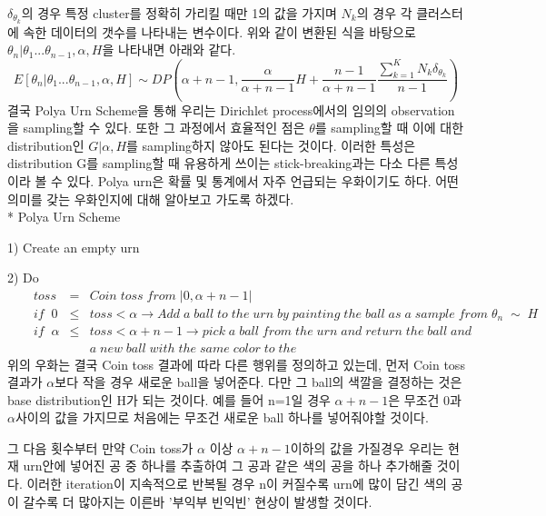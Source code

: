 \documentclass[a4paper]{oblivoir}
\begin{document}
$\delta_{\theta_{k}}$의 경우 특정 cluster를 정확히 가리킬 때만 1의 값을 가지며 $N_{k}$의 경우 각 클러스터에 속한 데이터의 갯수를 나타내는 변수이다. 위와 같이 변환된 식을 바탕으로 $\theta_{n}|\theta_{1}...\theta_{n-1},\alpha,H$을 나타내면 아래와 같다. 
\begin{equation}
E[\theta_{n}|\theta_{1}...\theta_{n-1},\alpha,H] \sim DP(\alpha+n-1,\frac{\alpha}{\alpha+n-1}H + \frac{n-1}{\alpha+n-1}\frac{\sum^{K}_{k=1}N_{k}\delta_{\theta_{k}}}{n-1})
\end{equation}
결국 Polya Urn Scheme을 통해 우리는 Dirichlet process에서의 임의의 observation을 sampling할 수 있다. 또한 그 과정에서 효율적인 점은 $\theta$를 sampling할 때 이에 대한 distribution인 $G|\alpha,H$를 sampling하지 않아도 된다는 것이다. 이러한 특성은 distribution G를 sampling할 때 유용하게 쓰이는 stick-breaking과는 다소 다른 특성이라 볼 수 있다. Polya urn은 확률 및 통계에서 자주 언급되는 우화이기도 하다. 어떤 의미를 갖는 우화인지에 대해 알아보고 가도록 하겠다. \\

* Polya Urn Scheme

1) Create an empty urn

2) Do
\begin{eqnarray}
\;\;\;\;\;\;toss & = & Coin\; toss\; from\; |0,\alpha+n-1|\nonumber\\
\;\;\;\;\;\;if\;\; 0 &\leq& toss < \alpha \rightarrow Add\;a\; ball\; to \;the\; urn\; by\; painting \;the\; ball\; as\; a\;sample\;from\;\theta_{n}\;\sim \;H\nonumber\\
\;\;\;\;\;\;if\;\; \alpha &\leq& toss < \alpha + n -1 \rightarrow pick\; a \;ball\; from\; the\; urn \;and \;return\; the\; ball\; and\nonumber\\
&  & a\; new\; ball\; with\; the\; same\; color\; to\; the\; \nonumber
\end{eqnarray}
위의 우화는 결국 Coin toss 결과에 따라 다른 행위를 정의하고 있는데, 먼저 Coin toss 결과가 $\alpha$보다 작을 경우 새로운 ball을 넣어준다. 다만 그 ball의 색깔을 결정하는 것은 base distribution인 H가 되는 것이다. 예를 들어 n=1일 경우 $\alpha +n-1$은 무조건 0과 $\alpha$사이의 값을 가지므로 처음에는 무조건 새로운 ball 하나를 넣어줘야할 것이다. 

그 다음 횟수부터 만약 Coin toss가  $\alpha$ 이상 $\alpha+n-1$이하의 값을 가질경우 우리는 현재 urn안에 넣어진 공 중 하나를 추출하여 그 공과 같은 색의 공을 하나 추가해줄 것이다. 이러한 iteration이 지속적으로 반복될 경우 n이 커질수록 urn에 많이 담긴 색의 공이 갈수록 더 많아지는 이른바 '부익부 빈익빈' 현상이 발생할 것이다. 
\end{document}
